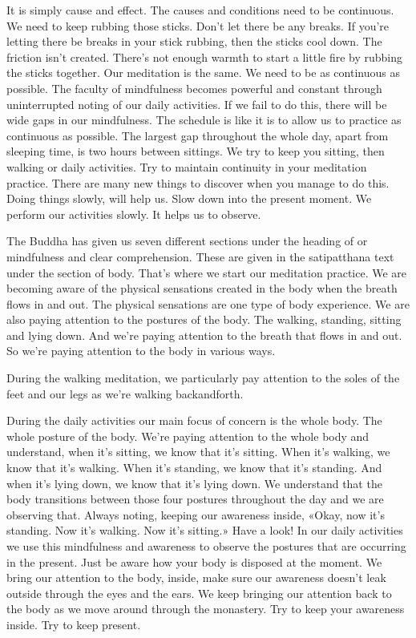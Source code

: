 \documentclass[letterpaper,10pt,english]{sphinxmanual}
\begin{document}
\sphinxAtStartPar
It is simply cause and effect.
The causes and conditions need to be continuous. We need to keep
rubbing those sticks. Don’t let there be any breaks. If you’re letting there be
breaks  in  your  stick  rubbing,  then  the  sticks  cool  down. The  friction  isn’t
created. There’s not enough warmth to start a little fire by rubbing the sticks
together. Our meditation is the same. We need to be as continuous as possible. The  faculty  of  mindfulness  becomes  powerful  and  constant  through
uninterrupted noting of our daily activities. If we fail to do this, there will
be  wide  gaps  in  our  mindfulness. The  schedule  is  like  it  is  to  allow  us  to
practice  as  continuous  as  possible.  The  largest  gap  throughout  the  whole
day, apart from sleeping time, is two hours between sittings. We try to keep
you  sitting,  then  walking  or  daily  activities. Try  to  maintain  continuity  in
your meditation practice. There are many new things to discover when you
manage  to  do  this.  Doing  things  slowly,  will  help  us.  Slow  down  into  the
present moment. We perform our activities slowly. It helps us to observe.

\sphinxAtStartPar
The Buddha has given us seven different sections under the heading of
or  mindfulness  and  clear  comprehension.  These  are  given
in the satipatthana text under the section of body. That’s where we start our
meditation practice. We are becoming aware of the physical sensations created in the body when the breath flows in and out. The physical sensations
are  one  type  of  body  experience. We  are  also  paying  attention  to  the  postures   of the body. The walking, standing, sitting and lying down. And we’re
paying attention to the breath that flows in and out. So we’re paying attention
to the body in various ways.

\sphinxAtStartPar
During  the  walking  meditation,  we  particularly  pay  attention  to  the
soles of the feet and our legs as we’re walking back\sphinxhyphen{}and\sphinxhyphen{}forth.

\sphinxAtStartPar
During the daily activities our main focus of concern is the whole body.
The whole posture of the body. We’re paying attention to the whole body and
understand, when it’s sitting, we know that it’s sitting. When it’s walking, we
know that it’s walking. When it’s standing, we know that it’s standing. And
when it’s lying down, we know that it’s lying down. We understand that the
body transitions between those four postures throughout the day and we are
observing that. Always noting, keeping our awareness inside, «Okay, now
it’s standing. Now it’s walking. Now it’s sitting.» Have a look! In our daily
activities we use this mindfulness and awareness to observe the postures that
are occurring in the present. Just be aware how your body is disposed at the
moment. We bring our attention to the body, inside, make sure our awareness doesn’t leak outside through the eyes and the ears. We keep bringing our
attention back to the body as we move around through the monastery. Try to
keep your awareness inside. Try to keep present.
\end{document}
